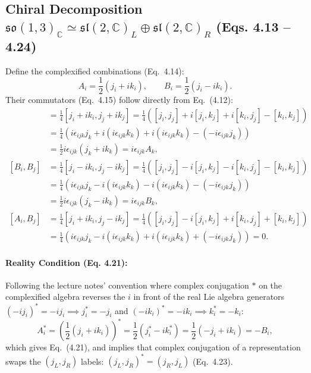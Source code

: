 \documentclass[11pt,a4paper]{article}
\begin{document}
\subsection{Chiral Decomposition $\mathfrak{so}(1,3)_{\mathbb{C}} \simeq \mathfrak{sl}(2,\mathbb{C})_L \oplus \mathfrak{sl}(2,\mathbb{C})_R$ (Eqs. 4.13 -- 4.24)}
Define the complexified combinations (Eq.~4.14):
\begin{equation}
    A_i = \frac{1}{2}(j_i + ik_i), \qquad B_i = \frac{1}{2}(j_i - ik_i).
\end{equation}
Their commutators (Eq.~4.15) follow directly from Eq.~(4.12):
\begin{align}
    [A_i, A_j] &= \frac{1}{4}[j_i + ik_i, j_j + ik_j] = \frac{1}{4}\left([j_i, j_j] + i[j_i, k_j] + i[k_i, j_j] - [k_i, k_j]\right) \nonumber \\
    &= \frac{1}{4}\left(i\epsilon_{ijk}j_k + i(i\epsilon_{ijk}k_k) + i(i\epsilon_{ijk}k_k) - (-i\epsilon_{ijk}j_k)\right) \nonumber \\
    &= \frac{1}{2}i\epsilon_{ijk}(j_k + ik_k) = i\epsilon_{ijk}A_k, \\[6pt]
    [B_i, B_j] &= \frac{1}{4}[j_i - ik_i, j_j - ik_j] = \frac{1}{4}\left([j_i, j_j] - i[j_i, k_j] - i[k_i, j_j] - [k_i, k_j]\right) \nonumber \\
    &= \frac{1}{4}\left(i\epsilon_{ijk}j_k - i(i\epsilon_{ijk}k_k) - i(i\epsilon_{ijk}k_k) - (-i\epsilon_{ijk}j_k)\right) \nonumber \\
    &= \frac{1}{2}i\epsilon_{ijk}(j_k - ik_k) = i\epsilon_{ijk}B_k, \\[6pt]
    [A_i, B_j] &= \frac{1}{4}[j_i + ik_i, j_j - ik_j] = \frac{1}{4}\left([j_i, j_j] - i[j_i, k_j] + i[k_i, j_j] + [k_i, k_j]\right) \nonumber \\
    &= \frac{1}{4}\left(i\epsilon_{ijk}j_k - i(i\epsilon_{ijk}k_k) + i(i\epsilon_{ijk}k_k) + (-i\epsilon_{ijk}j_k)\right) = 0.
\end{align}

\paragraph{Reality Condition (Eq. 4.21):}
Following the lecture notes' convention where complex conjugation $*$ on the complexified algebra reverses the $i$ in front of the real Lie algebra generators $(-ij_i)^* = -ij_i \implies j_i^* = -j_i$ and $(-ik_i)^* = -ik_i \implies k_i^* = -k_i$:
\begin{equation}
    A_i^* = \left(\frac{1}{2}(j_i + ik_i)\right)^* = \frac{1}{2}\left(j_i^* - ik_i^*\right) = \frac{1}{2}\left(-j_i + ik_i\right) = -B_i,
\end{equation}
which gives Eq.~(4.21), and implies that complex conjugation of a representation swaps the $(j_L, j_R)$ labels: $(j_L, j_R)^* = (j_R, j_L)$ (Eq.~4.23).
\end{document}
